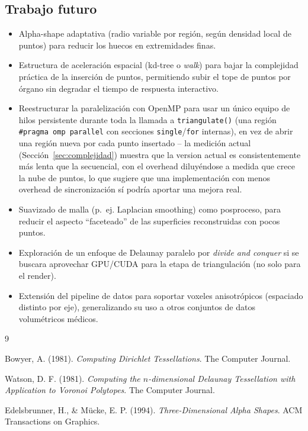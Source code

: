\documentclass[12pt,a4paper]{article}
\begin{document}
\subsection*{Trabajo futuro}

\begin{itemize}
    \item Alpha-shape adaptativa (radio variable por región, según
    densidad local de puntos) para reducir los huecos en extremidades
    finas.
    \item Estructura de aceleración espacial (kd-tree o \emph{walk})
    para bajar la complejidad práctica de la inserción de puntos,
    permitiendo subir el tope de puntos por órgano sin degradar el
    tiempo de respuesta interactivo.
    \item Reestructurar la paralelización con OpenMP para usar un único
    equipo de hilos persistente durante toda la llamada a
    \texttt{triangulate()} (una región \texttt{\#pragma omp parallel}
    con secciones \texttt{single}/\texttt{for} internas), en vez de
    abrir una región nueva por cada punto insertado -- la medición
    actual (Sección~\ref{sec:complejidad}) muestra que la version actual
    es consistentemente más lenta que la secuencial, con el overhead
    diluyéndose a medida que crece la nube de puntos, lo que sugiere que
    una implementación con menos overhead de sincronización sí podría
    aportar una mejora real.
    \item Suavizado de malla (p.~ej. Laplacian smoothing) como
    posproceso, para reducir el aspecto ``faceteado'' de las
    superficies reconstruidas con pocos puntos.
    \item Exploración de un enfoque de Delaunay paralelo por
    \emph{divide and conquer} si se buscara aprovechar GPU/CUDA para la
    etapa de triangulación (no solo para el render).
    \item Extensión del pipeline de datos para soportar voxeles
    anisotrópicos (espaciado distinto por eje), generalizando su uso a
    otros conjuntos de datos volumétricos médicos.
\end{itemize}

\begin{thebibliography}{9}

Bowyer, A. (1981). \emph{Computing Dirichlet Tessellations}. The Computer Journal.

Watson, D. F. (1981). \emph{Computing the $n$-dimensional Delaunay Tessellation with Application to Voronoi Polytopes}. The Computer Journal.

Edelsbrunner, H., \& Mücke, E. P. (1994). \emph{Three-Dimensional Alpha Shapes}. ACM Transactions on Graphics.

\end{thebibliography}
\end{document}
